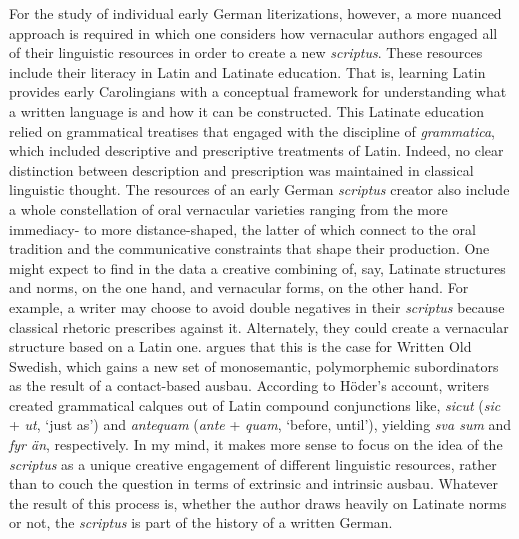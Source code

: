 For the study of individual early German literizations, however, a more nuanced approach is required in which one considers how vernacular authors engaged all of their linguistic resources in order to create a new \textit{scriptus}. These resources include their literacy in Latin and Latinate education. That is, learning Latin provides early Carolingians with a conceptual framework for understanding what a written language is and how it can be constructed. This Latinate education relied on grammatical treatises that engaged with the discipline of \textit{grammatica}, which included descriptive and prescriptive treatments of Latin. Indeed, no clear distinction between description and prescription was maintained in classical linguistic thought. The resources of an early German \textit{scriptus} creator also include a whole constellation of oral vernacular varieties ranging from the more immediacy- to more distance-shaped, the latter of which connect to the oral tradition and the communicative constraints that shape their production. One might expect to find in the data a creative combining of, say, Latinate structures and norms, on the one hand, and vernacular forms, on the other hand. For example, a writer may choose to avoid double negatives in their \textit{scriptus} because classical rhetoric prescribes against it. Alternately, they could create a vernacular structure based on a Latin one. \citet[159--160]{Höder2010} argues that this is the case for Written Old Swedish, which gains a new set of monosemantic, polymorphemic subordinators as the result of a contact-based ausbau. According to Höder’s account, writers created grammatical calques out of Latin compound conjunctions like, \textit{sicut} (\textit{sic} + \textit{ut}, ‘just as’) and \textit{antequam} (\textit{ante} + \textit{quam}, ‘before, until’), yielding \textit{sva sum} and \textit{fyr än}, respectively. In my mind, it makes more sense to focus on the idea of the \textit{scriptus} as a unique creative engagement of different linguistic resources, rather than to couch the question in terms of extrinsic and intrinsic ausbau. Whatever the result of this process is, whether the author draws heavily on Latinate norms or not, the \textit{scriptus} is part of the history of a written German.

